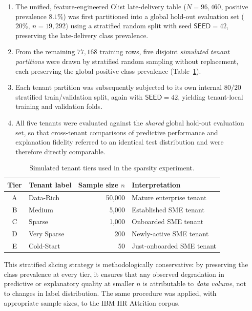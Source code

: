 \begin{enumerate}
    \item The unified, feature-engineered Olist late-delivery table
    ($N = 96{,}460$, positive prevalence $8.1\%$) was first partitioned into
    a global hold-out evaluation set ($20\%$, $n = 19{,}292$) using a
    stratified random split with seed $\textsf{SEED} = 42$, preserving the
    late-delivery class prevalence.
    \item From the remaining $77{,}168$ training rows, five disjoint
    \emph{simulated tenant partitions} were drawn by stratified random
    sampling without replacement, each preserving the global positive-class
    prevalence (Table~\ref{tab:tenant-tiers}).
    \item Each tenant partition was subsequently subjected to its own
    internal $80/20$ stratified train/validation split, again with
    $\textsf{SEED} = 42$, yielding tenant-local training and validation folds.
    \item All five tenants were evaluated against the \emph{shared} global
    hold-out evaluation set, so that cross-tenant comparisons of predictive
    performance and explanation fidelity referred to an identical test
    distribution and were therefore directly comparable.
\end{enumerate}

\begin{table}[h]
\centering
\caption{Simulated tenant tiers used in the sparsity experiment.}
\label{tab:tenant-tiers}
\renewcommand{\arraystretch}{1.2}
\begin{tabular}{@{}clrl@{}}
\toprule
\textbf{Tier} & \textbf{Tenant label} & \textbf{Sample size $n$} &
\textbf{Interpretation} \\
\midrule
A & Data-Rich    & 50{,}000 & Mature enterprise tenant \\
B & Medium       &  5{,}000 & Established SME tenant \\
C & Sparse       &  1{,}000 & Onboarded SME tenant \\
D & Very Sparse  &      200 & Newly-active SME tenant \\
E & Cold-Start   &       50 & Just-onboarded SME tenant \\
\bottomrule
\end{tabular}
\end{table}

This stratified slicing strategy is methodologically conservative: by
preserving the class prevalence at every tier, it ensures that any observed
degradation in predictive or explanatory quality at smaller $n$ is
attributable to \emph{data volume}, not to changes in label distribution.
The same procedure was applied, with appropriate sample sizes, to the IBM HR
Attrition corpus.

